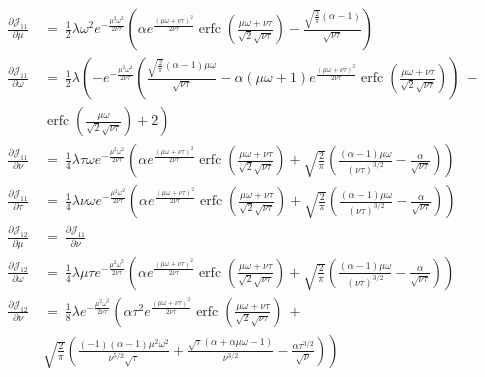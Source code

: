 \documentclass{article}
\DeclareMathOperator{\erfc}{erfc}
\begin{document}
\begin{align}
\frac{\partial {\mathcal J}_{11}}{\partial \mu} \ &= \
\frac{1}{2} \lambda  \omega^2 e^{-\frac{\mu^2 \omega^2}{2 \nu \tau}} \left(\alpha  e^{\frac{(\mu \omega+\nu \tau)^2}{2 \nu \tau}} \erfc \left(\frac{\mu \omega+\nu \tau}{\sqrt{2} \sqrt{\nu \tau}}\right)-\frac{\sqrt{\frac{2}{\pi }} (\alpha -1)}{\sqrt{\nu \tau}}\right)
\\ \nonumber
\frac{\partial {\mathcal J}_{11}}{\partial \omega} \ &= \
\frac{1}{2} \lambda  \left(-e^{-\frac{\mu^2 \omega^2}{2 \nu
  \tau}} \left(\frac{\sqrt{\frac{2}{\pi }} (\alpha -1) \mu
  \omega}{\sqrt{\nu \tau}}-\alpha  (\mu \omega+1)
  e^{\frac{(\mu \omega+\nu \tau)^2}{2 \nu
  \tau}} \erfc \left(\frac{\mu \omega+\nu
  \tau}{\sqrt{2} \sqrt{\nu \tau}}\right)\right) 
\ - \right. \\ \nonumber &\left. \erfc \left(\frac{\mu \omega}{\sqrt{2} \sqrt{\nu \tau}}\right)+2\right) \\ \nonumber
\frac{\partial {\mathcal J}_{11}}{\partial \nu} \ &= \
\frac{1}{4} \lambda  \tau \omega e^{-\frac{\mu^2 \omega^2}{2 \nu \tau}} \left(\alpha  e^{\frac{(\mu \omega+\nu \tau)^2}{2 \nu \tau}} \erfc \left(\frac{\mu \omega+\nu \tau}{\sqrt{2} \sqrt{\nu \tau}}\right)+\sqrt{\frac{2}{\pi }} \left(\frac{(\alpha -1) \mu \omega}{(\nu \tau)^{3/2}}-\frac{\alpha }{\sqrt{\nu \tau}}\right)\right)
\\ \nonumber
\frac{\partial {\mathcal J}_{11}}{\partial \tau} \ &= \
\frac{1}{4} \lambda  \nu \omega e^{-\frac{\mu^2 \omega^2}{2 \nu \tau}} \left(\alpha  e^{\frac{(\mu \omega+\nu \tau)^2}{2 \nu \tau}} \erfc \left(\frac{\mu \omega+\nu \tau}{\sqrt{2} \sqrt{\nu \tau}}\right)+\sqrt{\frac{2}{\pi }} \left(\frac{(\alpha -1) \mu \omega}{(\nu \tau)^{3/2}}-\frac{\alpha }{\sqrt{\nu \tau}}\right)\right)
\\ \nonumber
\frac{\partial {\mathcal J}_{12}}{\partial \mu} \ &= \ \frac{\partial {\mathcal J}_{11}}{\partial \nu}
\\ \nonumber
\frac{\partial {\mathcal J}_{12}}{\partial \omega} \ &= \
\frac{1}{4} \lambda  \mu \tau e^{-\frac{\mu^2 \omega^2}{2 \nu \tau}} \left(\alpha  e^{\frac{(\mu \omega+\nu \tau)^2}{2 \nu \tau}} \erfc \left(\frac{\mu \omega+\nu \tau}{\sqrt{2} \sqrt{\nu \tau}}\right)+\sqrt{\frac{2}{\pi }} \left(\frac{(\alpha -1) \mu \omega}{(\nu \tau)^{3/2}}-\frac{\alpha }{\sqrt{\nu \tau}}\right)\right)
\\ \nonumber
\frac{\partial {\mathcal J}_{12}}{\partial \nu} \ &= \
\frac{1}{8} \lambda  e^{-\frac{\mu^2 \omega^2}{2 \nu \tau}} \left(\alpha  \tau^2 e^{\frac{(\mu \omega+\nu \tau)^2}{2 \nu \tau}} \erfc \left(\frac{\mu \omega+\nu \tau}{\sqrt{2} \sqrt{\nu \tau}}\right)\ + \right. \\ \nonumber &\left. \sqrt{\frac{2}{\pi }} \left(\frac{(-1) (\alpha -1) \mu^2 \omega^2}{\nu^{5/2} \sqrt{\tau}}+\frac{\sqrt{\tau} (\alpha +\alpha  \mu \omega-1)}{\nu^{3/2}}-\frac{\alpha  \tau^{3/2}}{\sqrt{\nu}}\right)\right)

\end{align}
\end{document}
